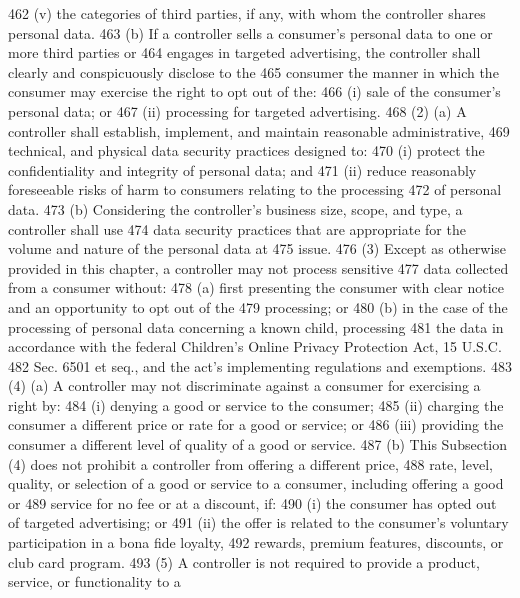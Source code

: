 462          (v) the categories of third parties, if any, with whom the controller shares personal data.
463          (b) If a controller sells a consumer's personal data to one or more third parties or
464     engages in targeted advertising, the controller shall clearly and conspicuously disclose to the
465     consumer the manner in which the consumer may exercise the right to opt out of the:
466          (i) sale of the consumer's personal data; or
467          (ii) processing for targeted advertising.
468          (2) (a) A controller shall establish, implement, and maintain reasonable administrative,
469     technical, and physical data security practices designed to:
470          (i) protect the confidentiality and integrity of personal data; and
471          (ii) reduce reasonably foreseeable risks of harm to consumers relating to the processing
472     of personal data.
473          (b) Considering the controller's business size, scope, and type, a controller shall use
474     data security practices that are appropriate for the volume and nature of the personal data at
475     issue.
476          (3) Except as otherwise provided in this chapter, a controller may not process sensitive
477     data collected from a consumer without:
478          (a) first presenting the consumer with clear notice and an opportunity to opt out of the
479     processing; or
480          (b) in the case of the processing of personal data concerning a known child, processing
481     the data in accordance with the federal Children's Online Privacy Protection Act, 15 U.S.C.
482     Sec. 6501 et seq., and the act's implementing regulations and exemptions.
483          (4) (a) A controller may not discriminate against a consumer for exercising a right by:
484          (i) denying a good or service to the consumer;
485          (ii) charging the consumer a different price or rate for a good or service; or
486          (iii) providing the consumer a different level of quality of a good or service.
487          (b) This Subsection (4) does not prohibit a controller from offering a different price,
488     rate, level, quality, or selection of a good or service to a consumer, including offering a good or
489     service for no fee or at a discount, if:
490          (i) the consumer has opted out of targeted advertising; or
491          (ii) the offer is related to the consumer's voluntary participation in a bona fide loyalty,
492     rewards, premium features, discounts, or club card program.
493          (5) A controller is not required to provide a product, service, or functionality to a
